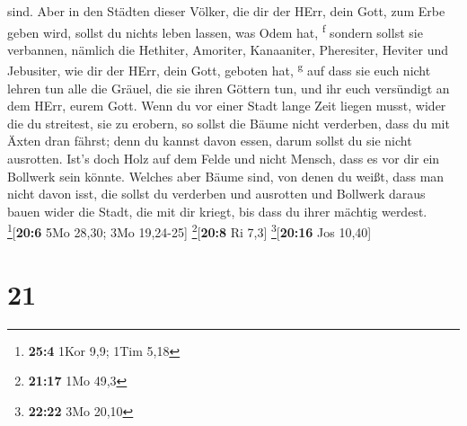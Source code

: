 sind.  Aber in den Städten dieser Völker, die dir der
HErr, dein Gott, zum Erbe geben wird, sollst du nichts leben lassen, was
Odem hat, \textsuperscript{f}  sondern sollst sie
verbannen, nämlich die Hethiter, Amoriter, Kanaaniter, Pheresiter,
Heviter und Jebusiter, wie dir der HErr, dein Gott, geboten hat,
\textsuperscript{g}  auf dass sie euch nicht lehren tun
alle die Gräuel, die sie ihren Göttern tun, und ihr euch versündigt an
dem HErr, eurem Gott.  Wenn du vor einer Stadt lange Zeit
liegen musst, wider die du streitest, sie zu erobern, so sollst die
Bäume nicht verderben, dass du mit Äxten dran fährst; denn du kannst
davon essen, darum sollst du sie nicht ausrotten. Ist's doch Holz auf
dem Felde und nicht Mensch, dass es vor dir ein Bollwerk sein könnte.
 Welches aber Bäume sind, von denen du weißt, dass man
nicht davon isst, die sollst du verderben und ausrotten und Bollwerk
daraus bauen wider die Stadt, die mit dir kriegt, bis dass du ihrer
mächtig werdest. \footnote{\textbf{25:4} 1Kor 9,9; 1Tim 5,18}{[}\textbf{20:6}
5Mo 28,30; 3Mo 19,24-25{]} \footnote{\textbf{21:17} 1Mo 49,3}{[}\textbf{20:8}
Ri 7,3{]} \footnote{\textbf{22:22} 3Mo 20,10}{[}\textbf{20:16} Jos
10,40{]}

\hypertarget{section-20}{%
\section{21}\label{section-20}}

